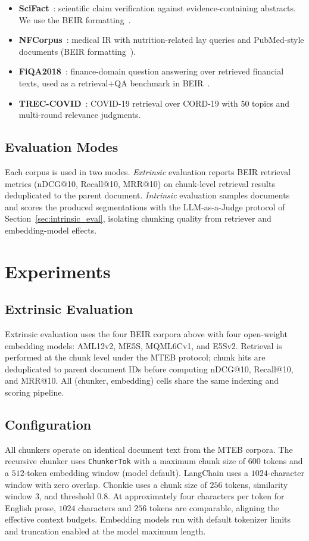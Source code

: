 \begin{itemize}
    \item \textbf{SciFact}~\cite{wadden2020scifact}: scientific claim verification against evidence-containing abstracts. We use the BEIR formatting~\cite{thakur2021beir,beir_scifact_hf}.
    \item \textbf{NFCorpus}~\cite{boteva2016nfcorpus}: medical IR with nutrition-related lay queries and PubMed-style documents (BEIR formatting~\cite{thakur2021beir,beir_nfcorpus_hf,irdatasets_nfcorpus}).
    \item \textbf{FiQA2018}~\cite{fiqa2018_site}: finance-domain question answering over retrieved financial texts, used as a retrieval$+$QA benchmark in BEIR~\cite{thakur2021beir}.
    \item \textbf{TREC-COVID}~\cite{roberts2021treccovid}: COVID-19 retrieval over CORD-19 with $50$ topics and multi-round relevance judgments.
\end{itemize}


\subsection{Evaluation Modes}
Each corpus is used in two modes. \emph{Extrinsic} evaluation reports BEIR retrieval metrics (nDCG@10, Recall@10, MRR@10) on chunk-level retrieval results deduplicated to the parent document. \emph{Intrinsic} evaluation samples documents and scores the produced segmentations with the LLM-as-a-Judge protocol of Section~\ref{sec:intrinsic_eval}, isolating chunking quality from retriever and embedding-model effects.


\section{Experiments}
\subsection{Extrinsic Evaluation}
Extrinsic evaluation uses the four BEIR corpora above with four open-weight embedding models: AML12v2, ME5S, MQML6Cv1, and E5Sv2. Retrieval is performed at the chunk level under the MTEB protocol; chunk hits are deduplicated to parent document IDs before computing nDCG@10, Recall@10, and MRR@10. All (chunker, embedding) cells share the same indexing and scoring pipeline.

\subsection{Configuration}
All chunkers operate on identical document text from the MTEB corpora. The recursive chunker uses \texttt{ChunkerTok} with a maximum chunk size of $600$ tokens and a $512$-token embedding window (model default). LangChain uses a $1024$-character window with zero overlap. Chonkie uses a chunk size of $256$ tokens, similarity window $3$, and threshold $0.8$. At approximately four characters per token for English prose, $1024$ characters and $256$ tokens are comparable, aligning the effective context budgets. Embedding models run with default tokenizer limits and truncation enabled at the model maximum length.

